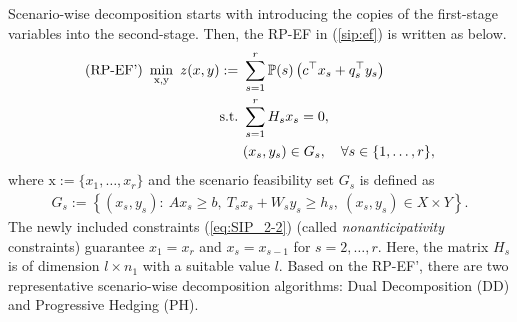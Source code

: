 Scenario-wise decomposition starts with introducing the copies of the first-stage variables into the second-stage. Then, the RP-EF in (\ref{sip:ef}) is written as below.
\begin{subequations} \label{sip:ef'}
	\begin{align}
	\textrm{(RP-EF') }\min_{\mathrm{x},\mathrm{y}}\ z(x,y):=\ &\sum_{s=1}^{r}\PP(s)\left(c^{\top}x_s+q_s^{\top}y_s\right)	\label{eq:SIP_2-1}\\ 
	\mathrm{s.t.}\ &\sum_{s=1}^{r}H_s x_s=0, \label{eq:SIP_2-2} \\
	\ &(x_s,y_s)\in G_s,\quad \forall s\in\{1,\ldots,r\},	\label{eq:SIP_2-3}
	\end{align}
\end{subequations}
where $\mathrm{x}:=\{x_1,\ldots,x_r\}$ and the scenario feasibility set $G_s$ is defined as
\begin{align} 
G_s:=\left\{ (x_s,y_s): \ Ax_s\ge b,\  T_s x_s+W_s y_s\ge h_s,\ (x_s,y_s)\in X\times Y  \right\}. \label{eq:SIP_2-4}
\end{align}
The newly included constraints (\ref{eq:SIP_2-2}) (called \textit{nonanticipativity} constraints) guarantee $x_1=x_r$ and $x_s=x_{s-1}$ for $s=2,\ldots,r$. Here, the matrix $H_s$ is of dimension $l\times n_1$ with a suitable value $l$. %
Based on the RP-EF', there are two representative scenario-wise decomposition algorithms: Dual Decomposition (DD) and Progressive Hedging (PH). 


